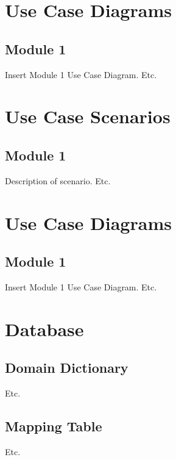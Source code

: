 \documentclass[english,12pt]{scrartcl}
\begin{document}
	\section{Use Case Diagrams} {
	
		\subsection{Module 1} {
			Insert Module 1 Use Case Diagram.
			Etc.
		}
	}
	
	\section{Use Case Scenarios} {
	
		\subsection{Module 1} {
			Description of scenario. Etc.
		}
	}
	
	\section{Use Case Diagrams} {
	
		\subsection{Module 1} {
			Insert Module 1 Use Case Diagram.
			Etc.
		}
	}
	
	\section{Database } {
	
		\subsection{Domain Dictionary} {
			Etc.
		}
		
		\subsection{Mapping Table} {
			Etc.
		}
	}
	\clearpage
	
	 {
		
	}
	
\end{document}
